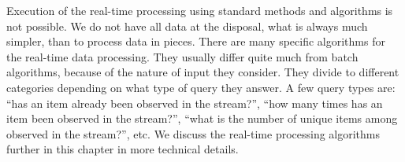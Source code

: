 Execution of the real-time processing using standard methods and algorithms is not possible.
We do not have all data at the disposal, what is always much simpler, than to process data in pieces.
There are many specific algorithms for the real-time data processing.
They usually differ quite much from batch algorithms, because of the nature of input they consider.
They divide to different categories depending on what type of query they answer.
A few query types are: ``has an item already been observed in the stream?'', ``how many times has an item been observed in the stream?'', ``what is the number of unique items among observed in the stream?'', etc.
We discuss the real-time processing algorithms further in this chapter in more technical details.




%